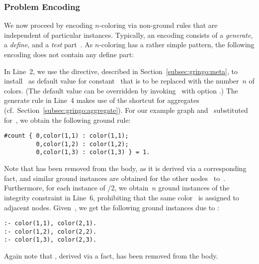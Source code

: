 \subsubsection{Problem Encoding}\label{subsec:color:encoding}

We now proceed by encoding $n$-coloring via non-ground rules that are
independent of particular instances.
Typically, an encoding consists of a \emph{generate}, a \emph{define},
and a \emph{test} part~\cite{lifschitz02a}.
As $n$-coloring has a rather simple pattern, the following encoding does
not contain any define part:
%

%
In Line~2, we use the  directive,
described in Section~\ref{subsec:gringo:meta},
to install~ as default value for constant~ that is to be replaced
with the number~$n$ of colors.
(The default value can be overridden by invoking \gringo\ with option
 .)
The generate rule in Line~4 makes use of the shortcut for  aggregates
(cf.\ Section~\ref{subsec:gringo:aggregate}).
For our example graph and~ substituted for~,
we obtain the following ground rule:%
%
\begin{lstlisting}[numbers=none]
#count { 0,color(1,1) : color(1,1);
         0,color(1,2) : color(1,2);
         0,color(1,3) : color(1,3) } = 1.
\end{lstlisting}
%
Note that  has been removed from the body,
as it is derived via a corresponding fact,
and similar ground instances are obtained for the other nodes~ to~.
Furthermore, for each instance of /2,
we obtain~$n$ ground instances of the integrity constraint in Line~6,
prohibiting that the same color~ is assigned to adjacent nodes.
Given~,
we get the following ground instances due to :
%
\begin{lstlisting}[numbers=none]
:- color(1,1), color(2,1).
:- color(1,2), color(2,2).
:- color(1,3), color(2,3).
\end{lstlisting}
%
Again note that ,
derived via a fact, has been removed from the body.

